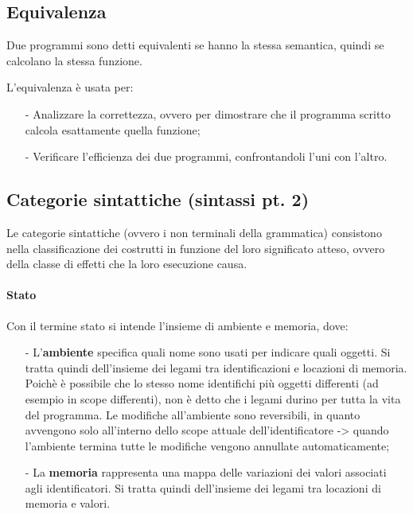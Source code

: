 \documentclass[a4paper, 10pt]{report}
\begin{document}
\subsection*{Equivalenza}

Due programmi sono detti equivalenti se hanno la stessa semantica, quindi se calcolano la stessa funzione.

L'equivalenza è usata per:
\begin{itemize}
\item[-] Analizzare la correttezza, ovvero per dimostrare che il programma scritto calcola esattamente quella funzione;
\item[-] Verificare l'efficienza dei due programmi, confrontandoli l'uni con l'altro.
\end{itemize}

\subsection*{Categorie sintattiche (sintassi pt. 2)}
Le categorie sintattiche (ovvero i non terminali della grammatica) consistono nella classificazione dei costrutti in funzione del loro significato atteso, ovvero della classe di effetti che la loro esecuzione causa.

\paragraph*{Stato} Con il termine stato si intende l'insieme di ambiente e memoria, dove:
\begin{itemize}
\item[-] L'\textbf{ambiente} specifica quali nome sono usati per indicare quali oggetti. Si tratta quindi dell'insieme dei legami tra identificazioni e locazioni di memoria. Poichè è possibile che lo stesso nome identifichi più oggetti differenti (ad esempio in scope differenti), non è detto che i legami durino per tutta la vita del programma. Le modifiche all'ambiente sono reversibili, in quanto avvengono solo all'interno dello scope attuale dell'identificatore -> quando l'ambiente termina tutte le modifiche vengono annullate automaticamente;
\item[-] La \textbf{memoria} rappresenta una mappa delle variazioni dei valori associati agli identificatori. Si tratta quindi dell'insieme dei legami tra locazioni di memoria e valori. 
\end{itemize}
\end{document}
